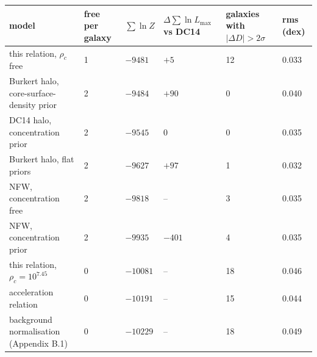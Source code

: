 \documentclass[
  10pt,
]{article}
\begin{document}
\begin{longtable}[]{@{}p{4.9cm}p{1.6cm}p{1.6cm}p{2.1cm}p{2.0cm}p{1.6cm}@{}}
\toprule
model & free per galaxy & $\sum\ln Z$ & $\Delta\sum\ln L_{\max}$ vs DC14 & galaxies with $|\Delta D|>2\sigma$ & rms (dex)\tabularnewline
\midrule
\endhead
this relation, $\rho_c$ free & 1 & $-9481$ & $+5$ & 12 & 0.033\tabularnewline
Burkert halo, core-surface-density prior & 2 & $-9484$ & $+90$ & 0 & 0.040\tabularnewline
DC14 halo, concentration prior & 2 & $-9545$ & 0 & 0 & 0.035\tabularnewline
Burkert halo, flat priors & 2 & $-9627$ & $+97$ & 1 & 0.032\tabularnewline
NFW, concentration free & 2 & $-9818$ & -- & 3 & 0.035\tabularnewline
NFW, concentration prior & 2 & $-9935$ & $-401$ & 4 & 0.035\tabularnewline
this relation, $\rho_c=10^{7.45}$ & 0 & $-10081$ & -- & 18 & 0.046\tabularnewline
acceleration relation & 0 & $-10191$ & -- & 15 & 0.044\tabularnewline
background normalisation (Appendix B.1) & 0 & $-10229$ & -- & 18 & 0.049\tabularnewline
\bottomrule
\end{longtable}
\end{document}
